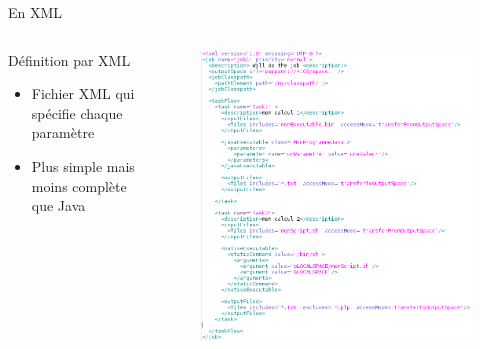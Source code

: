 \documentclass{beamer}
\begin{document}
\begin{frame}{En XML}
	\begin{columns}
	\begin{column}[l]{0.4\linewidth}
        \begin{exampleblock}{Définition par XML}
            \begin{itemize}
                \item Fichier XML qui spécifie chaque paramètre
                \item Plus simple mais moins complète que Java
            \end{itemize}
        \end{exampleblock}
	\end{column}
	\begin{column}[r]{0.6\linewidth}
        \vspace{-1cm}
        \begin{figure}
            \centering
            \includegraphics[scale=0.27]{jobxml.png}
        \end{figure}
	\end{column}
	\end{columns}
    
\end{frame}
\end{document}

